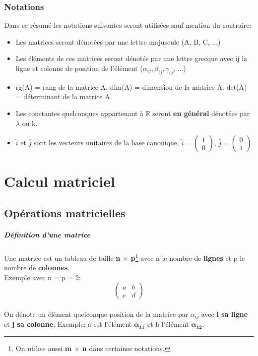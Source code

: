 \documentclass[10pt,a4paper]{book}
\newcommand{\R}{\mathbb{R}}
\newcommand{\x}{$\times$ }
\begin{document}
\subsection*{Notations}
Dans ce résumé les notations suivantes seront utilisées sauf mention du contraire:
\begin{itemize}
\item Les matrices seront dénotées par une lettre majuscule (A, B, C, ...)
\item Les éléments de ces matrices seront dénotés par une lettre grecque avec ij la ligne et colonne de position de l'élément (\(\alpha_{ij}, \beta_{ij}, \gamma_{ij}\), ...)
\item rg(A) = rang de la matrice A. dim(A) = dimension de la matrice A. det(A) = déterminant de la matrice A.
\item Les constantes quelconques appartenant à $\R$ seront \textbf{en général} dénotées par $\lambda$ ou k.
\item $\hat{i}$ et $\hat{j}$ sont les vecteurs unitaires de la base canonique, \(\hat{i} = \left(\begin{array}{c} 1 \\ 0 \end{array}\right)\), \(\hat{j} = \left(\begin{array}{c} 0 \\ 1 \end{array}\right)\)
\end{itemize}

\chapter{Calcul matriciel}

\section{Opérations matricielles}

\paragraph{Définition d'une matrice} Une matrice est un tableau de taille \textbf{n \x p}\footnote{On utilise aussi \textbf{m \x n} dans certaines notations.} avec n le nombre de \textbf{lignes} et p le nombre de \textbf{colonnes}. \\
Exemple avec n = p = 2:
\[\begin{pmatrix}
a & b \\
c & d
\end{pmatrix}\] \\
On dénote un élément quelconque position de la matrice par $\alpha_{ij}$ avec \textbf{i sa ligne} et \textbf{j sa colonne}. Exemple: a est l'élément $\mathbf{\alpha_{11}}$ et b l'élément $\mathbf{\alpha_{12}}$.
\end{document}
